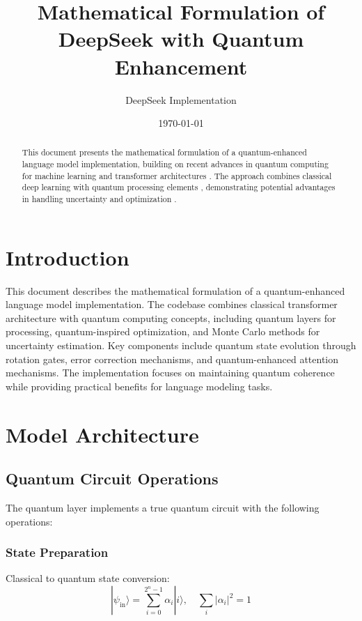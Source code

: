 \documentclass{article}
\title{Mathematical Formulation of DeepSeek with Quantum Enhancement}
\author{DeepSeek Implementation}
\date{\today}
\begin{document}
\maketitle

\begin{abstract}
This document presents the mathematical formulation of a quantum-enhanced language model implementation, building on recent advances in quantum computing for machine learning \citep{bharti2022noisy} and transformer architectures \citep{vaswani2017attention}. The approach combines classical deep learning with quantum processing elements \citep{schuld2019quantum}, demonstrating potential advantages in handling uncertainty \citep{gal2016dropout} and optimization \citep{farhi2018classification}.
\end{abstract}

\section*{Introduction}
This document describes the mathematical formulation of a quantum-enhanced language model implementation. The codebase combines classical transformer architecture with quantum computing concepts, including quantum layers for processing, quantum-inspired optimization, and Monte Carlo methods for uncertainty estimation. Key components include quantum state evolution through rotation gates, error correction mechanisms, and quantum-enhanced attention mechanisms. The implementation focuses on maintaining quantum coherence while providing practical benefits for language modeling tasks.

\section{Model Architecture}

\subsection{Quantum Circuit Operations}
The quantum layer implements a true quantum circuit with the following operations:

\subsubsection{State Preparation}
Classical to quantum state conversion:
\begin{equation}
|\psi_{\text{in}}\rangle = \sum_{i=0}^{2^n-1} \alpha_i|i\rangle, \quad \sum_i |\alpha_i|^2 = 1
\end{equation}
\end{document}
